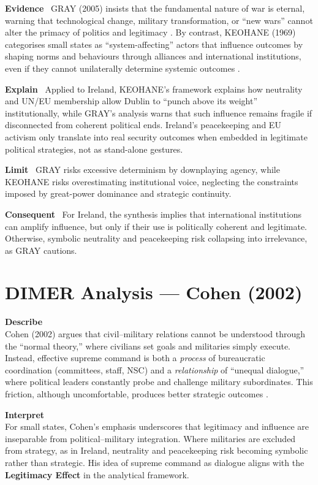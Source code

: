 \textbf{Evidence} \
GRAY (2005) insists that the fundamental nature of war is eternal, warning that technological change, military transformation, or “new wars” cannot alter the primacy of politics and legitimacy \parencite{GRAY_2005}. By contrast, KEOHANE (1969) categorises small states as “system-affecting” actors that influence outcomes by shaping norms and behaviours through alliances and international institutions, even if they cannot unilaterally determine systemic outcomes \parencite{KEOHANE_1969}.

\textbf{Explain} \
Applied to Ireland, KEOHANE’s framework explains how neutrality and UN/EU membership allow Dublin to “punch above its weight” institutionally, while GRAY’s analysis warns that such influence remains fragile if disconnected from coherent political ends. Ireland’s peacekeeping and EU activism only translate into real security outcomes when embedded in legitimate political strategies, not as stand-alone gestures.

\textbf{Limit} \
GRAY risks excessive determinism by downplaying agency, while KEOHANE risks overestimating institutional voice, neglecting the constraints imposed by great-power dominance and strategic continuity.

\textbf{Consequent} \
For Ireland, the synthesis implies that international institutions can amplify influence, but only if their use is politically coherent and legitimate. Otherwise, symbolic neutrality and peacekeeping risk collapsing into irrelevance, as GRAY cautions.

\section*{DIMER Analysis — Cohen (2002)}

\textbf{Describe} \\
Cohen (2002) argues that civil--military relations cannot be understood through the ``normal theory,'' where civilians set goals and militaries simply execute. Instead, effective supreme command is both a \textit{process} of bureaucratic coordination (committees, staff, NSC) and a \textit{relationship} of ``unequal dialogue,'' where political leaders constantly probe and challenge military subordinates. This friction, although uncomfortable, produces better strategic outcomes \parencite{COHEN_2002}.

\textbf{Interpret} \\
For small states, Cohen’s emphasis underscores that legitimacy and influence are inseparable from political--military integration. Where militaries are excluded from strategy, as in Ireland, neutrality and peacekeeping risk becoming symbolic rather than strategic. His idea of supreme command as dialogue aligns with the \textbf{Legitimacy Effect} in the analytical framework.

